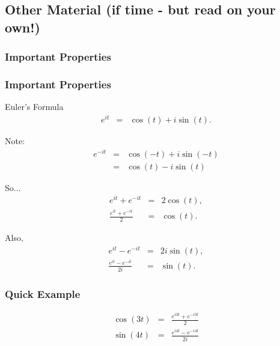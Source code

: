 {\begin{frame}
{     }\fi

    \vfill
    \vfill
    \vfill

\end{frame}

}


\subsection{Other Material (if time - but read on your own!)}

\subsubsection{Important Properties}

\begin{frame}
  \frametitle{Important Properties}

  Euler's Formula
  \begin{eqnarray*}
    e^{it} & = & \cos(t) + i\sin(t). 
  \end{eqnarray*}

  Note:
  \begin{eqnarray*}
    e^{-it} & = & \cos(-t) + i\sin(-t) \\
    & = & \cos(t) - i\sin(t)
  \end{eqnarray*}

  So...
  \begin{eqnarray*}
    e^{it} + e^{-it} & = & 2 \cos(t), \\
    \frac{e^{it} + e^{-it}}{2} & = & \cos(t).
  \end{eqnarray*}

  Also,
  \begin{eqnarray*}
    e^{it} - e^{-it} & = & 2 i \sin(t), \\
    \frac{e^{it} - e^{-it}}{2i} & = & \sin(t).
  \end{eqnarray*}



\end{frame}


\begin{frame}
  \frametitle{Quick Example}

  \begin{eqnarray*}
    \cos(3t) & = & \frac{e^{i3t}+e^{-i3t}}{2} \\
    \sin(4t) & = & \frac{e^{i4t}-e^{-i4t}}{2i}
  \end{eqnarray*}

\end{frame}

